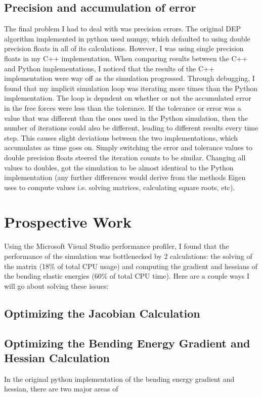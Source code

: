 \documentclass[letterpaper, 10 pt, conference]{ieeeconf}  %
\begin{document}
\subsection{Precision and accumulation of error}
        The final problem I had to deal with was precision errors. The original DEP algorithm implemented in python used numpy, which defaulted to using double precision floats in all of its calculations. However, I was using single precision floats in my C++ implementation. When comparing results between the C++ and Python implementations, I noticed that the results of the C++ implementation were way off as the simulation progressed. Through debugging, I found that my implicit simulation loop was iterating more times than the Python implementation. The loop is depndent on whether or not the accumulated error in the free forces were less than the tolerance. If the tolerance or error was a value that was different than the ones used in the Python simulation, then the number of iterations could also be different, leading to different results every time step. This causes slight deviations between the two implementations, which accumulates as time goes on. Simply switching the error and tolerance values to double precision floats steered the iteration counts to be similar. Changing all values to doubles, got the simulation to be almost identical to the Python implementation (any further differences would derive from the methods Eigen uses to compute values i.e. solving matrices, calculating square roots, etc).


\section{Prospective Work}
        Using the Microsoft Visual Studio performance profiler, I found that the performance of the simulation was bottlenecked by 2 calculations: the solving of the matrix (18\% of total CPU usage) and computing the gradient and hessians of the bending elastic energies (60\% of total CPU time). Here are a couple ways I will go about solving these issues:

\subsection{Optimizing the Jacobian Calculation}

\subsection{Optimizing the Bending Energy Gradient and Hessian Calculation}
In the original python implementation of the bending energy gradient and hessian, there are two major areas of 
\end{document}
